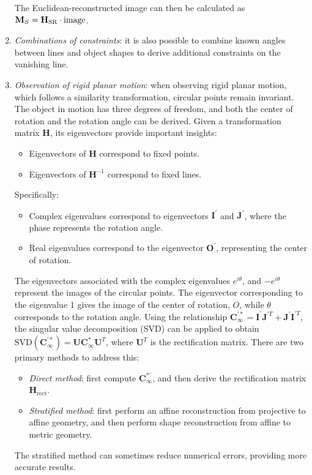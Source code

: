 \begin{enumerate}
        The Euclidean-reconstructed image can then be calculated as $\mathbf{M}_S=\mathbf{H}_\text{SR} \cdot \textnormal{image}$. 
    \item \textit{Combinations of constraints}: it is also possible to combine known angles between lines and object shapes to derive additional constraints on the vanishing line. 
    \item \textit{Observation of rigid planar motion}: when observing rigid planar motion, which follows a similarity transformation, circular points remain invariant.
        The object in motion has three degrees of freedom, and both the center of rotation and the rotation angle can be derived.
        Given a transformation matrix $\mathbf{H}$, its eigenvectors provide important insights:
        \begin{itemize}
            \item Eigenvectors of $\mathbf{H}$ correspond to fixed points.
            \item Eigenvectors of $\mathbf{H}^{-1}$ correspond to fixed lines.
        \end{itemize}
        Specifically:
        \begin{itemize}
            \item Complex eigenvalues correspond to eigenvectors $\mathbf{I}^\prime$ and $\mathbf{J}^\prime$, where the phase represents the rotation angle.
            \item Real eigenvalues correspond to the eigenvector $\mathbf{O}^\prime$, representing the center of rotation.
        \end{itemize}
        The eigenvectors associated with the complex eigenvalues $e^{i\theta}$, and $-e^{i\theta}$ represent the images of the circular points.
        The eigenvector corresponding to the eigenvalue 1 gives the image of the center of rotation, $O$, while $\theta$ corresponds to the rotation angle.
        Using the relationship $\mathbf{C}_{\infty}^{\prime\ast}=\mathbf{I}^\prime \mathbf{J}^{\prime T}+\mathbf{J}^\prime \mathbf{I}^{\prime T}$, the singular value decomposition (SVD) can be applied to obtain $\text{SVD}(\mathbf{C}_{\infty}^{\prime\ast})=\mathbf{UC}_{\infty}^\ast \mathbf{U}^T$, where $\mathbf{U}^T$ is the rectification matrix. 
        There are two primary methods to address this:
        \begin{itemize}
            \item \textit{Direct method}: first compute $\mathbf{C}_{\infty}^{\ast\prime}$, and then derive the rectification matrix $\mathbf{H}_{\text{rect}}$.
            \item \textit{Stratified method}: first perform an affine reconstruction from projective to affine geometry, and then perform shape reconstruction from affine to metric geometry.
        \end{itemize}
        The stratified method can sometimes reduce numerical errors, providing more accurate results.
\end{enumerate}